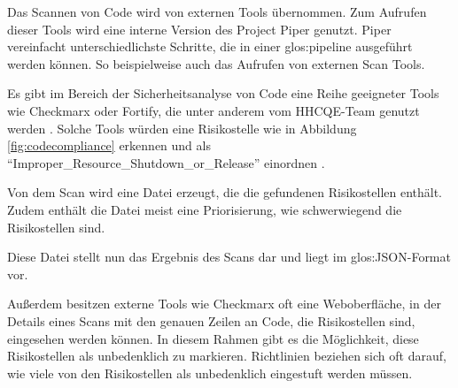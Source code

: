 \documentclass[../main.tex]{subfiles}
\begin{document}
Das Scannen von Code wird von externen Tools übernommen.
Zum Aufrufen dieser Tools wird eine interne Version des Project Piper genutzt. Piper vereinfacht unterschiedlichste Schritte, die in einer \gls{glos:pipeline} ausgeführt werden können.
So beispielweise auch das Aufrufen von externen Scan Tools. 

Es gibt im Bereich der Sicherheitsanalyse von Code eine Reihe geeigneter Tools wie Checkmarx oder Fortify, die unter anderem vom \gls{HHCQE}-Team genutzt werden \cite{SASTTools}.
Solche Tools würden eine Risikostelle wie in Abbildung \ref{fig:codecompliance} erkennen und als \enquote{Improper\_Resource\_Shutdown\_or\_Release} einordnen \cite{SecurityVulnerabilities}.

Von dem Scan wird eine Datei erzeugt, die die gefundenen Risikostellen enthält.
Zudem enthält die Datei meist eine Priorisierung, wie schwerwiegend die Risikostellen sind.

Diese Datei stellt nun das Ergebnis des Scans dar und liegt im \gls{glos:JSON}-Format vor.

Außerdem besitzen externe Tools wie Checkmarx oft eine Weboberfläche, in der Details eines Scans mit den genauen Zeilen an Code, die Risikostellen sind, eingesehen werden können.
In diesem Rahmen gibt es die Möglichkeit, diese Risikostellen als unbedenklich zu markieren.
Richtlinien beziehen sich oft darauf, wie viele von den Risikostellen als unbedenklich eingestuft werden müssen.
\end{document}

